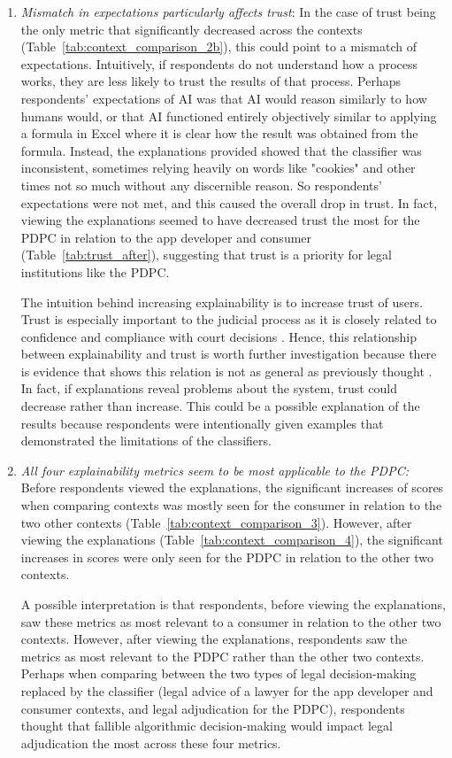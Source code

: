 \begin{enumerate}[listparindent=0.5cm]
    \item \textit{Mismatch in expectations particularly affects trust}: In the case of trust being the only metric that significantly decreased across the contexts (Table~\ref{tab:context_comparison_2b}), this could point to a mismatch of expectations. Intuitively, if respondents do not understand how a process works, they are less likely to trust the results of that process. Perhaps respondents' expectations of AI was that AI would reason similarly to how humans would, or that AI functioned entirely objectively similar to applying a formula in Excel where it is clear how the result was obtained from the formula. Instead, the explanations provided showed that the classifier was inconsistent, sometimes relying heavily on words like "cookies" and other times not so much without any discernible reason. So respondents' expectations were not met, and this caused the overall drop in trust. In fact, viewing the explanations seemed to have decreased trust the most for the PDPC in relation to the app developer and consumer (Table~\ref{tab:trust_after}), suggesting that trust is a priority for legal institutions like the PDPC.
    
    The intuition behind increasing explainability is to increase trust of users. Trust is especially important to the judicial process as it is closely related to confidence and compliance with court decisions \cite{goodman2021}. Hence, this relationship between explainability and trust is worth further investigation because there is evidence that shows this relation is not as general as previously thought \cite{kastner2021}. In fact, if explanations reveal problems about the system, trust could decrease rather than increase. This could be a possible explanation of the results because respondents were intentionally given examples that demonstrated the limitations of the classifiers.
    
    \item \textit{All four explainability metrics seem to be most applicable to the PDPC:} Before respondents viewed the explanations, the significant increases of scores when comparing contexts was mostly seen for the consumer in relation to the two other contexts (Table~\ref{tab:context_comparison_3}). However, after viewing the explanations (Table~\ref{tab:context_comparison_4}), the significant increases in scores were only seen for the PDPC in relation to the other two contexts. 
    
    A possible interpretation is that respondents, before viewing the explanations, saw these metrics as most relevant to a consumer in relation to the other two contexts. However, after viewing the explanations, respondents saw the metrics as most relevant to the PDPC rather than the other two contexts. Perhaps when comparing between the two types of legal decision-making replaced by the classifier (legal advice of a lawyer for the app developer and consumer contexts, and legal adjudication for the PDPC), respondents thought that fallible algorithmic decision-making would impact legal adjudication the most across these four metrics.
\end{enumerate}

